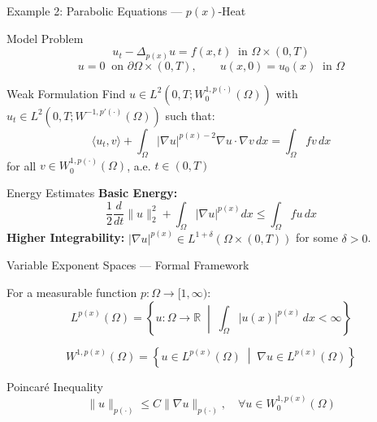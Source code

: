 \documentclass[11pt]{beamer}
\let\oldcite\cite
\renewcommand{\cite}[1]{\textcolor{red}{\textbf{\oldcite{#1}}}}
\begin{document}
	\begin{frame}[allowframebreaks]{Example 2: Parabolic Equations — $p(x)$-Heat}
		\begin{block}{Model Problem}
			\[
			u_t - \Delta_{p(x)} u = f(x, t) \ \text{ in } \Omega \times (0, T)
			\]
			\[
			u = 0 \ \text{ on } \partial\Omega \times (0, T), \qquad u(x, 0) = u_0(x) \ \text{ in } \Omega
			\]
		\end{block}
		
		\begin{block}{Weak Formulation}
			\small
			Find $u \in L^2(0, T; W_0^{1, p(\cdot)}(\Omega))$ with $u_t \in L^2(0, T; W^{-1, p'(\cdot)}(\Omega))$ such that:
			\[
			\langle u_t, v \rangle + \int_\Omega |\nabla u|^{p(x)-2}\nabla u \cdot \nabla v \, dx = \int_\Omega f v \, dx
			\]
			for all $v \in W_0^{1, p(\cdot)}(\Omega)$, a.e. $t \in (0, T)$
		\end{block}
		
		\begin{block}{Energy Estimates}
			\textbf{Basic Energy:}
			\[
			\frac{1}{2}\frac{d}{dt}\|u\|_2^2 + \int_\Omega |\nabla u|^{p(x)} dx \le \int_\Omega f u \, dx
			\]
			\textbf{Higher Integrability:} $|\nabla u|^{p(x)} \in L^{1 + \delta}(\Omega \times (0, T))$ for some $\delta > 0$.
		\end{block}
	\end{frame}
	
	\begin{frame}{Variable Exponent Spaces — Formal Framework \cite{diening2011}}
		\begin{definition}
			For a measurable function $p: \Omega \to [1, \infty)$:
			\[
			L^{p(x)}(\Omega) = \left\{ u : \Omega \to \mathbb{R} \;\middle|\; \int_\Omega |u(x)|^{p(x)} \, dx < \infty \right\}
			\]
		\end{definition}
		
		\begin{definition}
			\[
			W^{1, p(x)}(\Omega) = \left\{ u \in L^{p(x)}(\Omega) \;\middle|\; \nabla u \in L^{p(x)}(\Omega) \right\}
			\]
		\end{definition}
		
		\begin{block}{Poincaré Inequality}
			\[
			\|u\|_{p(\cdot)} \le C\|\nabla u\|_{p(\cdot)}, \quad \forall u \in W_0^{1, p(x)}(\Omega)
			\]
		\end{block}
	\end{frame}
	
\end{document}
